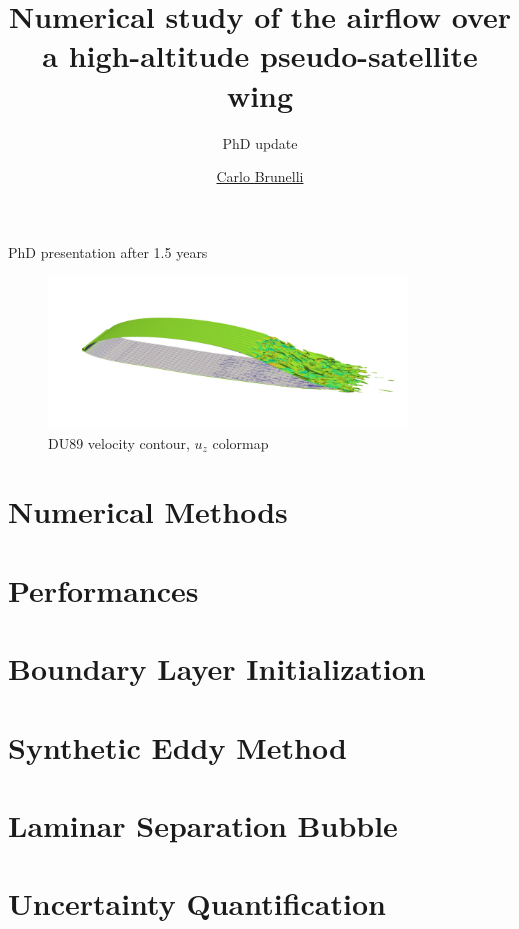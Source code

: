 \documentclass{beamer}
\title{Numerical study of the airflow over a high-altitude pseudo-satellite wing}
\subtitle{PhD update}
\author{\href{mailto:mail@carlobrunelli.com}{Carlo Brunelli}}
\begin{document}
\maketitle


\begin{frame}

PhD presentation after 1.5 years
\begin{figure}[h]
	\centering          
		\includegraphics[width=0.85\textwidth]{ du89_vcontour.png}
		\caption{DU89 velocity contour, $u_z$ colormap}
	\end{figure} 
\end{frame}

\section{Numerical Methods}



\section{Performances}


\section{Boundary Layer Initialization}


\section{Synthetic Eddy Method}



\section{Laminar Separation Bubble}


\section{Uncertainty Quantification}

\end{document}
